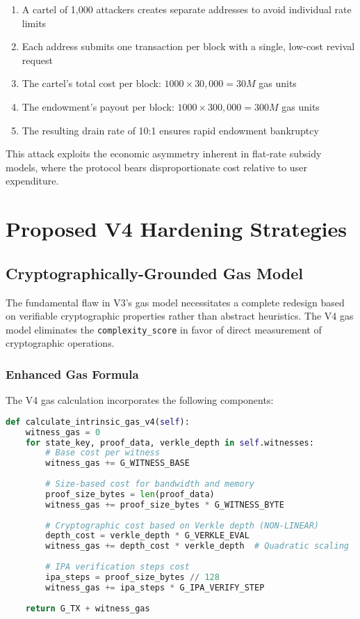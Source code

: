 \documentclass{article}
\begin{document}
\begin{enumerate}
\item A cartel of 1,000 attackers creates separate addresses to avoid individual rate limits
\item Each address submits one transaction per block with a single, low-cost revival request
\item The cartel's total cost per block: $1000 \times 30,000 = 30M$ gas units
\item The endowment's payout per block: $1000 \times 300,000 = 300M$ gas units
\item The resulting drain rate of 10:1 ensures rapid endowment bankruptcy
\end{enumerate}

This attack exploits the economic asymmetry inherent in flat-rate subsidy models, where the protocol bears disproportionate cost relative to user expenditure.

\section{Proposed V4 Hardening Strategies}

\subsection{Cryptographically-Grounded Gas Model}

The fundamental flaw in V3's gas model necessitates a complete redesign based on verifiable cryptographic properties rather than abstract heuristics. The V4 gas model eliminates the \texttt{complexity\_score} in favor of direct measurement of cryptographic operations.

\subsubsection{Enhanced Gas Formula}

The V4 gas calculation incorporates the following components:

\begin{lstlisting}[language=Python,caption={V4 Gas Calculation Model},label={lst:v4gas}]
def calculate_intrinsic_gas_v4(self):
    witness_gas = 0
    for state_key, proof_data, verkle_depth in self.witnesses:
        # Base cost per witness
        witness_gas += G_WITNESS_BASE
        
        # Size-based cost for bandwidth and memory
        proof_size_bytes = len(proof_data)
        witness_gas += proof_size_bytes * G_WITNESS_BYTE
        
        # Cryptographic cost based on Verkle depth (NON-LINEAR)
        depth_cost = verkle_depth * G_VERKLE_EVAL
        witness_gas += depth_cost * verkle_depth  # Quadratic scaling
        
        # IPA verification steps cost
        ipa_steps = proof_size_bytes // 128
        witness_gas += ipa_steps * G_IPA_VERIFY_STEP
    
    return G_TX + witness_gas
\end{lstlisting}
\end{document}
